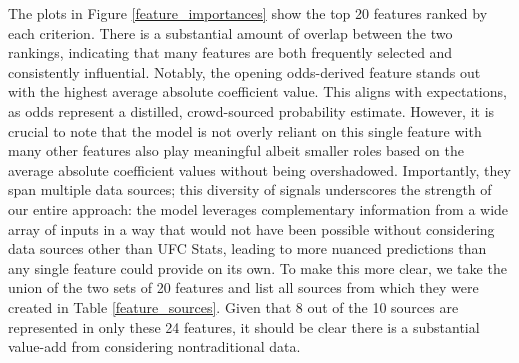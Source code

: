 \documentclass[12pt,twoside]{report}
\begin{document}
The plots in Figure \ref{feature_importances} show the top 20 features ranked by each criterion. There is a substantial amount of overlap between the two rankings, indicating that many features are both frequently selected and consistently influential. Notably, the opening odds-derived feature stands out with the highest average absolute coefficient value. This aligns with expectations, as odds represent a distilled, crowd-sourced probability estimate. However, it is crucial to note that the model is not overly reliant on this single feature with many other features also play meaningful albeit smaller roles based on the average absolute coefficient values without being overshadowed. Importantly, they span multiple data sources; this diversity of signals underscores the strength of our entire approach: the model leverages complementary information from a wide array of inputs in a way that would not have been possible without considering data sources other than UFC Stats, leading to more nuanced predictions than any single feature could provide on its own. To make this more clear, we take the union of the two sets of 20 features and list all sources from which they were created in Table \ref{feature_sources}. Given that 8 out of the 10 sources are represented in only these 24 features, it should be clear there is a substantial value-add from considering nontraditional data.
\end{document}

